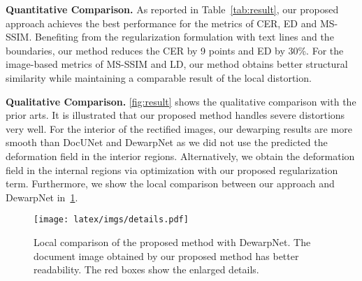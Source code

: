 \documentclass[10pt,twocolumn,letterpaper]{article}
\newcommand{\myparagraph}[1]{\vspace{1pt} \noindent \textbf{#1} }
\begin{document}
\myparagraph{Quantitative Comparison.} 
As reported in Table~\ref{tab:result}, our proposed approach achieves the best performance for the metrics of CER, ED and MS-SSIM. Benefiting from the regularization formulation with text lines and the boundaries, our method reduces the CER by 9 points and ED by 30\%. For the image-based metrics of MS-SSIM and LD, our method obtains better structural similarity while maintaining a comparable result of the local distortion.


\myparagraph{Qualitative Comparison.} \cref{fig:result} shows the qualitative comparison with the prior arts. It is illustrated that our proposed method handles severe distortions very well. For the interior of the rectified images, our dewarping results are more smooth than DocUNet and DewarpNet as we did not use the predicted the deformation field in the interior regions. Alternatively, we obtain the deformation field in the internal regions via optimization with our proposed regularization term. Furthermore, we show the local comparison between our approach and DewarpNet in~\cref{fig:details}. 











\begin{figure}[t]
  \centering
\texttt{[image: latex/imgs/details.pdf]}
  \vspace{-2mm}
  \caption{Local comparison of the proposed method with DewarpNet. The document image obtained by our proposed method has better readability. The red boxes show the enlarged details.}
  \label{fig:details}
\end{figure}
\end{document}
